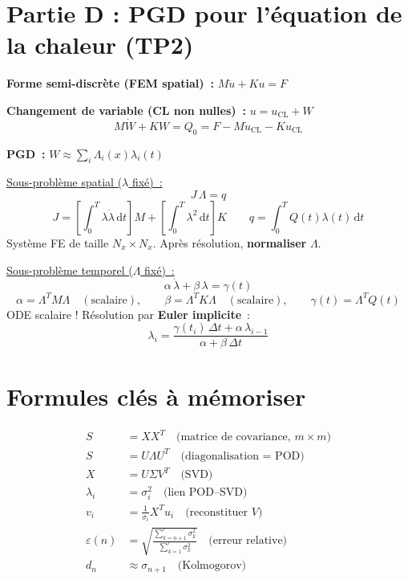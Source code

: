 \documentclass[11pt,a4paper]{article}
\begin{document}
\section{Partie D : PGD pour l'\'equation de la chaleur (TP2)}

\begin{formulabox}[Sch\'ema complet -- $\rho c\,\partial_t u - k\,\partial_{xx}u = f(x,t)$]

\textbf{Forme semi-discr\`ete (FEM spatial)~:} $M\dot{u} + Ku = F$

\textbf{Changement de variable (CL non nulles)~:} $u = u_\text{CL} + W$
\[
M\dot{W} + KW = Q_0 = F - M\dot{u}_\text{CL} - Ku_\text{CL}
\]

\textbf{PGD~:} $W \approx \sum_i \Lambda_i(x)\lambda_i(t)$

\medskip
\underline{Sous-probl\`eme spatial ($\lambda$ fix\'e)~:}
\[
\boxed{J\,\Lambda = q}
\]
\[
J = \left[\int_0^T\lambda\dot{\lambda}\,\mathrm{d}t\right]M + \left[\int_0^T\lambda^2\,\mathrm{d}t\right]K \qquad q = \int_0^T Q(t)\lambda(t)\,\mathrm{d}t
\]
Syst\`eme FE de taille $N_x\times N_x$. Apr\`es r\'esolution, \textbf{normaliser} $\Lambda$.

\medskip
\underline{Sous-probl\`eme temporel ($\Lambda$ fix\'e)~:}
\[
\boxed{\alpha\,\dot{\lambda} + \beta\,\lambda = \gamma(t)}
\]
\[
\alpha = \Lambda^T M\Lambda \quad(\text{scalaire}), \qquad \beta = \Lambda^T K\Lambda \quad(\text{scalaire}), \qquad \gamma(t) = \Lambda^T Q(t)
\]
ODE scalaire ! R\'esolution par \textbf{Euler implicite}~:
\[
\boxed{\lambda_i = \frac{\gamma(t_i)\,\Delta t + \alpha\,\lambda_{i-1}}{\alpha + \beta\,\Delta t}}
\]
\end{formulabox}

\section{Formules cl\'es \`a m\'emoriser}

\begin{membox}
\begin{align*}
S &= XX^T \quad\text{(matrice de covariance, }m\times m\text{)} \\
S &= U\Lambda U^T \quad\text{(diagonalisation = POD)} \\
X &= U\Sigma V^T \quad\text{(SVD)} \\
\lambda_i &= \sigma_i^2 \quad\text{(lien POD--SVD)} \\
v_i &= \tfrac{1}{\sigma_i}X^Tu_i \quad\text{(reconstituer }V\text{)} \\
\varepsilon(n) &= \sqrt{\frac{\sum_{k=n+1}^{r}\sigma_k^2}{\sum_{k=1}^{r}\sigma_k^2}} \quad\text{(erreur relative)} \\
d_n &\approx \sigma_{n+1} \quad\text{(Kolmogorov)}
\end{align*}
\end{membox}
\end{document}
